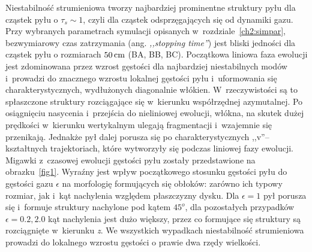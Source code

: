 Niestabilność strumieniowa tworzy najbardziej prominentne struktury pyłu dla
cząstek pyłu o $\tau_s \sim 1$, czyli dla cząstek odsprzęgających się od
dynamiki gazu.
Przy wybranych parametrach symulacji opisanych w~rozdziale~\ref{ch2:simpar},
bezwymiarowy czas zatrzymania (ang. \emph{,,stopping time''}) jest bliski
jedności dla cząstek pyłu o rozmiarach $50\hbox{$\thinspace\textrm{cm}$}$ (BA, BB, BC). Początkowa liniowa
faza ewolucji jest zdominowana przez wzrost gęstości dla najbardziej
niestabilnych modów i~prowadzi do znacznego wzrostu lokalnej gęstości pyłu
i~uformowania się charakterystycznych, wydłużonych diagonalnie włókien.
W~rzeczywistości są to spłaszczone struktury rozciągające się w~kierunku
współrzędnej azymutalnej. Po osiągnięciu nasycenia i~przejścia do nieliniowej
ewolucji, włókna, na skutek dużej prędkości w~kierunku wertykalnym ulegają
fragmentacji i~wzajemnie się przenikają. Jednakże pył dalej porusza się po
charakterystycznych ,,v''--kształtnych trajektoriach, które wytworzyły się
podczas liniowej fazy ewolucji. Migawki z~czasowej ewolucji gęstości pyłu
zostały przedstawione na obrazku~\ref{fig1}. Wyraźny jest wpływ początkowego
stosunku gęstości pyłu do gęstości gazu $\epsilon$ na morfologię formujących się
obłoków: zarówno ich typowy rozmiar, jak i~kąt nachylenia względem płaszczyzny
dysku. Dla $\epsilon = 1$ pył porusza się i~formuje struktury nachylone pod
kątem $45^o$, dla pozostałych przypadków $\epsilon=0.2, 2.0$ kąt nachylenia jest
dużo większy, przez co formujące się struktury są rozciągnięte w~kierunku
\emph{z}. We wszystkich wypadkach niestabilność strumieniowa prowadzi do
lokalnego wzrostu gęstości o prawie dwa rzędy wielkości.

